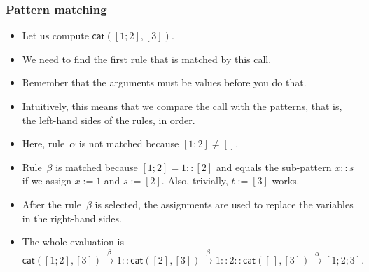 \documentclass[compress,dvipdfmx]{beamer}
\newcommand\fun[1]{\textsf{#1}}
\newcommand\el{[\,]}
\newcommand\cons[2]{{#1}\!::\!{#2}}
\begin{document}
\begin{frame}
  \frametitle{Pattern matching}

  \begin{itemize}

    \item Let us compute \(\fun{cat}([1;2],[3])\).

    \item We need to find the first rule that is matched by this call.

    \item Remember that the arguments must be values before you do
      that.

    \item Intuitively, this means that we compare the call with the
      patterns, that is, the left\hyp{}hand sides of the rules, in
      order.

    \item Here, rule~\(\alpha\) is not matched because \([1;2] \neq
      []\).

    \item Rule~\(\beta\) is matched because \([1;2] = 1::[2]\) and
      equals the sub\hyp{}pattern \(x::s\) if we assign \(x := 1\) and
      \(s := [2]\). Also, trivially, \(t := [3]\) works.

    \item After the rule~\(\beta\) is selected, the assignments are
      used to replace the variables in the right\hyp{}hand sides.

    \item The whole evaluation is
    \begin{equation*}
      \fun{cat}([1;2],[3])
      \xrightarrow{\beta}
      \cons{1}{\fun{cat}([2],[3])}
      \xrightarrow{\beta}
      \cons{1}{\cons{2}{\fun{cat}(\el,[3])}}
      \xrightarrow{\alpha}
                    [1;2;3].
    \end{equation*}
  \end{itemize}

\end{frame}
\end{document}

